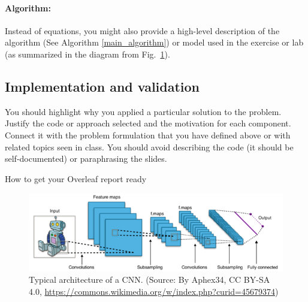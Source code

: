 \documentclass[twocolumn]{article}
\begin{document}
\paragraph{Algorithm:} Instead of equations, you might also provide a high-level description of the algorithm (See Algorithm \ref{main_algorithm}) or model used in the exercise or lab (as summarized in the diagram from Fig.~\ref{fig:CNN}). 

\subsection{Implementation and validation}
You should highlight why you applied a particular solution to the problem. Justify the code or approach selected and the motivation for each component. Connect it with the problem formulation that you have defined above or with related topics seen in class. You should avoid describing the code (it should be self-documented) or paraphrasing the slides.

\begin{algorithm}[!tb]
 
 
 \caption{How to get your Overleaf report ready}
 \label{main_algorithm}
\end{algorithm}



\begin{figure}[!htb]
\centering
\includegraphics[width=\columnwidth]{images/640px-Typical_cnn.png}
\caption{Typical architecture of a CNN. {\footnotesize (Source: By Aphex34, CC BY-SA 4.0, \url{https://commons.wikimedia.org/w/index.php?curid=45679374})}}
\label{fig:CNN}
\end{figure}
\end{document}
